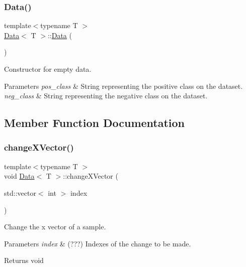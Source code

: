 \subsubsection{\texorpdfstring{Data()}{Data()}\hspace{0.1cm}{\footnotesize\ttfamily [2/2]}}
{\footnotesize\ttfamily template$<$typename T $>$ \\
\mbox{\hyperlink{class_data}{Data}}$<$ T $>$\+::\mbox{\hyperlink{class_data}{Data}} (\begin{DoxyParamCaption}{ }\end{DoxyParamCaption})}



Constructor for empty data. 


\begin{DoxyParams}{Parameters}
{\em pos\+\_\+class} & String representing the positive class on the dataset. \\
\hline
{\em neg\+\_\+class} & String representing the negative class on the dataset. \\
\hline
\end{DoxyParams}


\subsection{Member Function Documentation}
\mbox{\label{class_data_a9cf86608e6a02b80c9755646d7cb55fb}} 
\subsubsection{\texorpdfstring{change\+X\+Vector()}{changeXVector()}}
{\footnotesize\ttfamily template$<$typename T $>$ \\
void \mbox{\hyperlink{class_data}{Data}}$<$ T $>$\+::change\+X\+Vector (\begin{DoxyParamCaption}\item[{std\+::vector$<$ int $>$}]{index }\end{DoxyParamCaption})}



Change the x vector of a sample. 


\begin{DoxyParams}{Parameters}
{\em index} & (???) Indexes of the change to be made. \\
\hline
\end{DoxyParams}
\begin{DoxyReturn}{Returns}
void 
\end{DoxyReturn}
\mbox{\label{class_data_ae1cc8dec46ae498a0d00f4e573edc795}} 
